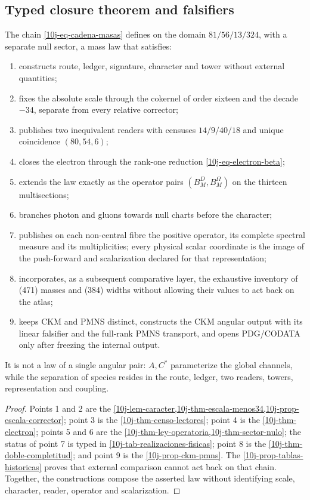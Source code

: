 \subsection{Typed closure theorem and falsifiers}

\begin{theorem}
\label{10j-thm-ley-general}
The chain \eqref{10j-eq-cadena-masas} defines on the domain \(81/56/13/324\), with a separate null sector, a mass law that satisfies:
\begin{enumerate}
 \item constructs route, ledger, signature, character and tower without external quantities;
 \item fixes the absolute scale through the cokernel of order sixteen and the decade \(-34\), separate from every relative corrector;
 \item publishes two inequivalent readers with censuses \(14/9/40/18\) and unique coincidence \((80,54,6)\);
 \item closes the electron through the rank-one reduction \eqref{10j-eq-electron-beta};
 \item extends the law exactly as the operator pairs \((B_M^D,B_M^\Omega)\) on the thirteen multisections;
 \item branches photon and gluons towards null charts before the character;
 \item publishes on each non-central fibre the positive operator, its complete spectral measure and its multiplicities; every physical scalar coordinate is the image of the push-forward and scalarization declared for that representation;
 \item incorporates, as a subsequent comparative layer, the exhaustive inventory of (471) masses and (384) widths without allowing their values to act back on the atlas;
 \item keeps CKM and PMNS distinct, constructs the CKM angular output with its linear falsifier and the full-rank PMNS transport, and opens PDG/CODATA only after freezing the internal output.
\end{enumerate}
It is not a law of a single angular pair: \(A,C^*\) parameterize the global channels, while the separation of species resides in the route, ledger, two readers, towers, representation and coupling.
\end{theorem}

\begin{proof}
Points 1 and 2 are the \cref{10j-lem-caracter,10j-thm-escala-menos34,10j-prop-escala-corrector}; point 3 is the \cref{10j-thm-censo-lectores}; point 4 is the \cref{10j-thm-electron}; points 5 and 6 are the \cref{10j-thm-ley-operatoria,10j-thm-sector-nulo}; the status of point 7 is typed in \cref{10j-tab-realizaciones-fisicas}; point 8 is the \cref{10j-thm-doble-completitud}; and point 9 is the \cref{10j-prop-ckm-pmns}. The \cref{10j-prop-tablas-historicas} proves that external comparison cannot act back on that chain. Together, the constructions compose the asserted law without identifying scale, character, reader, operator and scalarization.
\end{proof}

